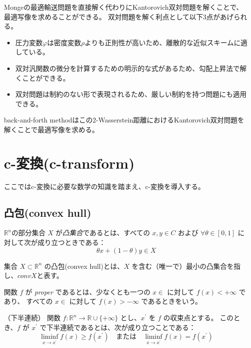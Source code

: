Mongeの最適輸送問題を直接解く代わりにKantorovich双対問題を解くことで、最適写像を求めることができる。
双対問題を解く利点として以下3点があげられる。
\begin{itemize}
    \item 圧力変数$\varphi$は密度変数$\rho$よりも正則性が高いため、離散的な近似スキームに適している。
    \item 双対汎関数の微分を計算するための明示的な式があるため、勾配上昇法で解くことができる。
    \item 双対問題は制約のない形で表現されるため、厳しい制約を持つ問題にも適用できる。    
\end{itemize}

back-and-forth methodはこの2-Wasserstein距離におけるKantorovich双対問題を解くことで最適写像を求める。

\section{c-変換(c-transform)}
\label{sect:c-変換(c-transform)}
ここではc-変換に必要な数学の知識を踏まえ、c-変換を導入する。
\subsection{凸包(convex hull)}
\label{sect:凸包(convex hull)}
\begin{dfn}[凸集合]
    $\mathbb{R}^n$の部分集合 $X$ が\textit{凸集合}であるとは、すべての $x, y \in C$ および $\forall \theta \in [0, 1]$ に対して次が成り立つときである：
    \[
        \theta x + (1 - \theta )y \in X
    \]
\end{dfn}

\begin{dfn}
    集合 $X \subset \mathbb{R}^n$ の凸包(convex hull)とは、$X$ を含む（唯一で）最小の凸集合を指し、$conv X$と表す。

\end{dfn}

\begin{dfn}
    関数 $f$ が \textit{proper} であるとは、少なくとも一つの $x \in $ に対して $f(x) < +\infty$ であり、
    すべての $x \in $ に対して $f(x) > - \infty$ であるときをいう。
\end{dfn}

\begin{dfn}（下半連続）
    関数 $f: \mathbb{R}^n \to \mathbb{R} \cup \{+ \infty\}$ とし、$x^{\prime}$ を $f$ の収束点とする。
    このとき、$f$ が $x^{\prime}$ で下半連続であるとは、次が成り立つことである：
    \[
        \liminf_{x \to x^{\prime}} {f(x)} \ge f(x^{\prime}) \quad \text{または} \quad \liminf_{x \to x^{\prime}} {f(x)} = f(x^{\prime}) 
    \]
\end{dfn}

